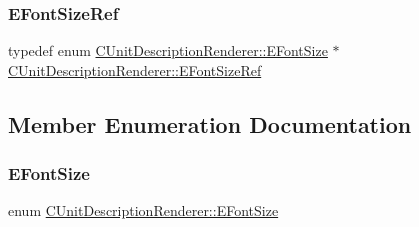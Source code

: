 \subsubsection{\texorpdfstring{E\+Font\+Size\+Ref}{EFontSizeRef}}
{\footnotesize\ttfamily typedef  enum \hyperlink{classCUnitDescriptionRenderer_a3ea4cd83b6dd9533ab3abb953a7da35a}{C\+Unit\+Description\+Renderer\+::\+E\+Font\+Size} $\ast$ \hyperlink{classCUnitDescriptionRenderer_a80d47a4b8bb5558bff5db296b614dd75}{C\+Unit\+Description\+Renderer\+::\+E\+Font\+Size\+Ref}}



\subsection{Member Enumeration Documentation}
\hypertarget{classCUnitDescriptionRenderer_a3ea4cd83b6dd9533ab3abb953a7da35a}{}\label{classCUnitDescriptionRenderer_a3ea4cd83b6dd9533ab3abb953a7da35a} 
\subsubsection{\texorpdfstring{E\+Font\+Size}{EFontSize}}
{\footnotesize\ttfamily enum \hyperlink{classCUnitDescriptionRenderer_a3ea4cd83b6dd9533ab3abb953a7da35a}{C\+Unit\+Description\+Renderer\+::\+E\+Font\+Size}}

